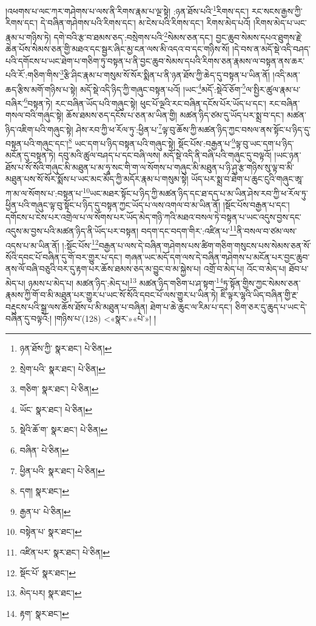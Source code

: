།འཕགས་པ་ལང་ཀར་གཤེགས་པ་ལས་ནི་རིགས་རྣམ་པ་ལྔ་སྟེ། :ཉན་ཐོས་པའི་\footnote{ཉན་ཐོས་ཀྱི་  སྣར་ཐང་།  པེ་ཅིན། }རིགས་དང་། རང་སངས་རྒྱས་ཀྱི་རིགས་དང་། དེ་བཞིན་གཤེགས་པའི་རིགས་དང་། མ་ངེས་པའི་རིགས་དང་། རིགས་མེད་པའོ། །རིགས་མེད་པ་ཡང་རྣམ་པ་གཉིས་ཏེ། དགེ་བའི་རྩ་བ་ཐམས་ཅད་:བསྲེགས་པའི་\footnote{སྲེག་པའི་  སྣར་ཐང་།  པེ་ཅིན། }སེམས་ཅན་དང་། བྱང་ཆུབ་སེམས་དཔའ་ཐུགས་རྗེ་ཆེན་པོས་སེམས་ཅན་གྱི་མཐའ་དང་སྦྱར་ཞིང་མྱ་ངན་ལས་མི་འདའ་བ་དང་གཉིས་སོ། །དེ་བས་ན་མདོ་སྡེ་འདི་བཤད་པའི་དགོངས་པ་ཡང་ཐེག་པ་གཅིག་ཏུ་བསྟན་པ་ནི་བྱང་ཆུབ་སེམས་དཔའི་རིགས་ཅན་རྣམས་ལ་བསྟན་ནས་ཆར་པའི་རོ་:གཅིག་གིས་\footnote{གཅིག་  སྣར་ཐང་།  པེ་ཅིན། }རྩི་ཤིང་རྣམ་པ་གསུམ་སོ་སོར་སྨིན་པ་ནི་ཉན་ཐོས་ཀྱི་ཆེད་དུ་བསྟན་པ་ཡིན་ནོ། །འདི་མན་ཆད་རྩིས་མགོ་གཉིས་པ་སྟེ། མདོ་སྡེ་འདི་ཉིད་ཀྱི་གཞུང་བསྟན་པའོ། །ཡང་\footnote{ཡོང་  སྣར་ཐང་།  པེ་ཅིན། }མདོ་:སྡེའོ་ཅོག་\footnote{སྡེའི་ཆོ་ག་  སྣར་ཐང་།  པེ་ཅིན། }ལ་སྤྱིར་ཚུལ་རྣམ་པ་བཞིར་\footnote{བཞིན་  པེ་ཅིན། }བསྟན་ཏེ། རང་བཞིན་ཡོད་པའི་གཞུང་སྟེ། ཕུང་པོ་ལྔའི་རང་བཞིན་དངོས་པོར་ཡོད་པ་དང་། རང་བཞིན་གསལ་བའི་གཞུང་སྟེ། ཆོས་ཐམས་ཅད་དངོས་པ་ཅན་མ་ཡིན་གྱི། མཚན་ཉིད་ཙམ་དུ་ཡོད་པར་སྨྲ་བ་དང་། མཚན་ཉིད་འཇིག་པའི་གཞུང་སྟེ། ཤེས་རབ་ཀྱི་ཕ་རོལ་ཏུ་:ཕྱིན་པ་\footnote{ཕྱིན་པའི་  སྣར་ཐང་།  པེ་ཅིན། }ལྟ་བུ་ཆོས་ཀྱི་མཚན་ཉིད་ཀྱང་བསལ་ནས་སྟོང་པ་ཉིད་དུ་བསྟན་པའི་གཞུང་དང་།\footnote{དག།  སྣར་ཐང་། } ཡང་དག་པ་ཉིད་བསྟན་པའི་གཞུང་སྟེ། སྡོང་པོས་:བརྒྱན་པ་\footnote{རྒྱན་པ་  པེ་ཅིན། }ལྟ་བུ་ཡང་དག་པ་ཉིད་མངོན་དུ་བསྟན་ཏེ། དབུ་མའི་ཚུལ་བཤད་པ་དང་བཞི་ལས། མདོ་སྡེ་འདི་ནི་བཞི་པའི་གཞུང་དུ་བལྟའོ། །ཡང་ཉན་ཐོས་པ་སོ་སོའི་གཞུང་མི་མཐུན་པ་མ་ཧཱ་སང་གི་ག་ལ་སོགས་པ་གཞུང་མི་མཐུན་པ་ཉི་ཤུ་རྩ་གཉིས་སུ་ལྟ་བ་མི་མཐུན་པས་སོ་སོར་སྨོས་པ་ཡང་མང་མོད་ཀྱི་མདོར་རྣམ་པ་གསུམ་སྟེ། ཡོད་པར་སྨྲ་བ་ཐེག་པ་ཆུང་ངུའི་གཞུང་ཨཱ་ཀ་མ་ལ་སོགས་པ་:བསྟན་པ་\footnote{བསྟེན་པ་  སྣར་ཐང་། }ཡང་མཐར་སྟོང་པ་ཉིད་ཀྱི་མཚན་ཉིད་དང་ཐ་དད་པ་མ་ཡིན་ཤེས་རབ་ཀྱི་ཕ་རོལ་ཏུ་ཕྱིན་པའི་གཞུང་ལྟ་བུ་སྟོང་པ་ཉིད་དུ་བསྟན་ཀྱང་ཡོད་པ་ལས་འགལ་བ་མ་ཡིན་ནོ། །སྡོང་པོས་བརྒྱན་པ་དང་། དགོངས་པ་ངེས་པར་འགྲེལ་པ་ལ་སོགས་པར་ཡོད་མེད་གཉི་ཀའི་མཐའ་བསལ་ཏེ་བསྟན་པ་ཡང་འདུས་བྱས་དང་འདུས་མ་བྱས་པའི་མཚན་ཉིད་ནི་ཡོད་པར་བསྟན། བདག་དང་བདག་གིར་:འཛིན་པ་\footnote{འཛིན་པར་  སྣར་ཐང་།  པེ་ཅིན། }ནི་བསལ་བ་ཙམ་ལས་འདས་པ་མ་ཡིན་ནོ། །:སྡོང་པོས་\footnote{སྡོང་པོ་  སྣར་ཐང་། }བརྒྱན་པ་ལས་དེ་བཞིན་གཤེགས་པས་ཚིག་གཅིག་གསུངས་པས་སེམས་ཅན་སོ་སོའི་དབང་པོ་བཞིན་དུ་གོ་བར་གྱུར་པ་དང་། གཞན་ཡང་མདོ་དག་ལས་དེ་བཞིན་གཤེགས་པ་མངོན་པར་བྱང་ཆུབ་ནས་ལོ་བཞི་བཅུའི་བར་དུ་རྟག་པར་ཆོས་ཐམས་ཅད་མ་བྱུང་བ་མ་སྐྱེས་པ། འགྲོ་བ་མེད་པ། འོང་བ་མེད་པ། ཐོབ་པ་མེད་པ། ཉམས་པ་མེད་པ། མཚན་ཉིད་:མེད་པ།\footnote{མེད་པར།  སྣར་ཐང་། } མཚན་ཉིད་གཅིག་པ་ཤ་སྟག་\footnote{རྟག་  སྣར་ཐང་། }ཏུ་སྟོན་གྱིས་ཀྱང་སེམས་ཅན་རྣམས་ཀྱི་གོ་བ་མི་མཐུན་པར་གྱུར་པ་ཡང་སོ་སོའི་དབང་པོ་ལས་གྱུར་པ་ཡིན་ཏེ། ཇི་ལྟར་ལྷའི་ཡིད་བཞིན་གྱི་རྔ་བརྡུངས་པའི་སྒྲ་ལས་ཆོས་ཐོས་པ་མི་མཐུན་པ་བཞིན། ཐེག་པ་ཆེ་ཆུང་ལ་རིམ་པ་དང་། ཅིག་ཅར་དུ་ཆུད་པ་ཡང་དེ་བཞིན་དུ་བལྟའོ:། །གཉིས་པ་(128) <«སྣར་»«པེ་»། །
